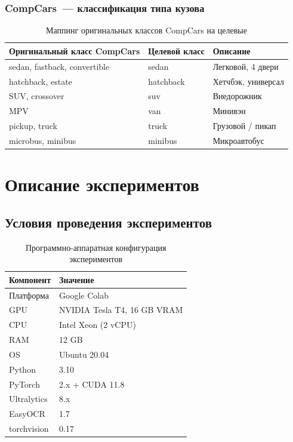 \documentclass[14pt,a4paper]{report}
\numberwithin{equation}{chapter}
\numberwithin{figure}{chapter}
\numberwithin{table}{chapter}
\begin{document}
\subsection{CompCars~--- классификация типа кузова}

\begin{table}[H]
\centering
\caption{Маппинг оригинальных классов CompCars на целевые}
\label{tab:compcars}
\begin{tabularx}{\textwidth}{lXX}
\toprule
\textbf{Оригинальный класс CompCars} & \textbf{Целевой класс} & \textbf{Описание} \\
\midrule
sedan, fastback, convertible & sedan    & Легковой, 4 двери \\
hatchback, estate            & hatchback& Хетчбэк, универсал \\
SUV, crossover               & suv      & Внедорожник \\
MPV                          & van      & Минивэн \\
pickup, truck                & truck    & Грузовой / пикап \\
microbus, minibus            & minibus  & Микроавтобус \\
\bottomrule
\end{tabularx}
\end{table}

\chapter{Описание экспериментов}

\section{Условия проведения экспериментов}

\begin{table}[H]
\centering
\caption{Программно-аппаратная конфигурация экспериментов}
\label{tab:env}
\begin{tabularx}{\textwidth}{lX}
\toprule
\textbf{Компонент} & \textbf{Значение} \\
\midrule
Платформа         & Google Colab \\
GPU               & NVIDIA Tesla T4, 16 GB VRAM \\
CPU               & Intel Xeon (2 vCPU) \\
RAM               & 12 GB \\
OS                & Ubuntu 20.04 \\
Python            & 3.10 \\
PyTorch           & 2.x + CUDA 11.8 \\
Ultralytics       & 8.x \\
EasyOCR           & 1.7 \\
torchvision       & 0.17 \\
\bottomrule
\end{tabularx}
\end{table}
\end{document}
